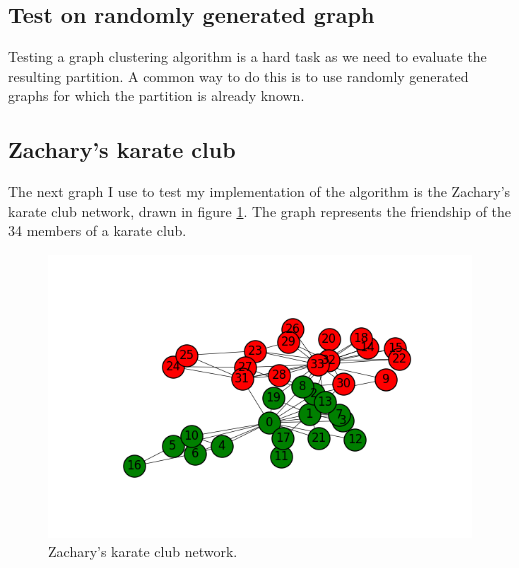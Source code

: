 \documentclass[12pt]{article}
\theoremstyle{definition}
\begin{document}
\subsection{Test on randomly generated graph}
Testing a graph clustering algorithm is a hard task as we need to evaluate the resulting partition. A common way to do this is to use randomly generated graphs for which the partition is already known.

\subsection{Zachary's karate club \cite{zachary1977information}}
The next graph I use to test my implementation of the algorithm is the Zachary's karate club network, drawn in figure \ref{fig_karate_graph}. The graph represents the friendship of the 34 members of a karate club. 

\begin{figure}[h]
	\includegraphics[scale=0.5]{karate_graph}
	\centering
	\caption{Zachary's karate club network.}
	\label{fig_karate_graph}
\end{figure}
\end{document}
